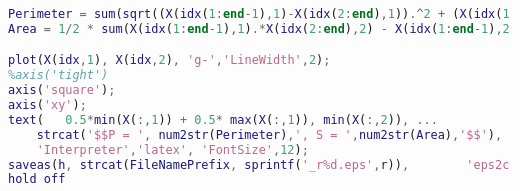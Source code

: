 \begin{lstlisting}[language=matlab, frame=lines]
Perimeter = sum(sqrt((X(idx(1:end-1),1)-X(idx(2:end),1)).^2 + (X(idx(1:end-1),2)-X(idx(2:end),2)).^2) )
Area = 1/2 * sum(X(idx(1:end-1),1).*X(idx(2:end),2) - X(idx(1:end-1),2).*X(idx(2:end),1))

plot(X(idx,1), X(idx,2), 'g-','LineWidth',2);
%axis('tight')
axis('square');
axis('xy');
text(   0.5*min(X(:,1)) + 0.5* max(X(:,1)), min(X(:,2)), ...
    strcat('$$P = ', num2str(Perimeter),', S = ',num2str(Area),'$$'), ...
    'Interpreter','latex', 'FontSize',12);
saveas(h, strcat(FileNamePrefix, sprintf('_r%d.eps',r)),        'eps2c');
hold off
\end{lstlisting}

